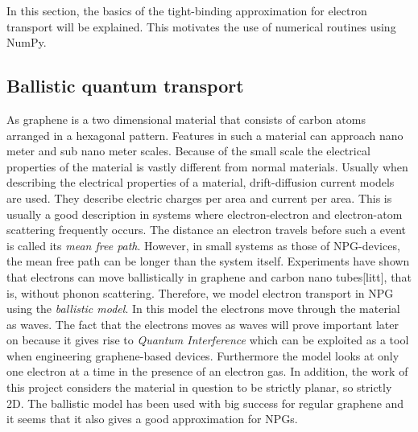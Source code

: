 In this section, the basics of the tight-binding approximation for electron transport will be explained. This motivates the use of numerical routines using NumPy.
\subsection{Ballistic quantum transport}
As graphene is a two dimensional material that consists of carbon atoms arranged in a hexagonal pattern. Features in such a material can approach nano meter and sub nano meter scales. Because of the small scale the electrical properties of the material is vastly different from normal materials. Usually when describing the electrical properties of a material, drift-diffusion current models are used. They describe electric charges per area and current per area. This is usually a good description in systems where electron-electron and electron-atom scattering frequently occurs. The distance an electron travels before such a event is called its \textit{mean free path}. However, in small systems as those of NPG-devices, the mean free path can be longer than the system itself. Experiments have shown that electrons can move ballistically in graphene and carbon nano tubes[litt], that is, without phonon scattering. Therefore, we model electron transport in NPG using the \textit{ballistic model}. In this model the electrons move through the material as waves. The fact that the electrons moves as waves will prove important later on because it gives rise to \textit{Quantum Interference} which can be exploited as a tool when engineering graphene-based devices\cite{markussen_relation_2010}. Furthermore the model looks at only one electron at a time in the presence of an electron gas. In addition, the work of this project considers the material in question to be strictly planar, so strictly 2D.  The ballistic model has been used with big success for regular graphene and it seems that it also gives a good approximation for NPGs.

